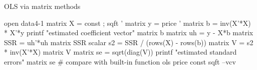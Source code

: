 \begin{script}[htbp]
  \caption{OLS via matrix methods}
  \label{examp-matrix}
\begin{code}
  open data4-1
  matrix X = { const ; sqft }'
  matrix y = { price }'
  matrix b = inv(X'*X) * X'*y
  printf "estimated coefficient vector\n"
  matrix b
  matrix uh = y - X*b
  matrix SSR = uh'*uh
  matrix SSR
  scalar s2 = SSR / (rows(X) - rows(b))
  matrix V = s2 * inv(X'*X)
  matrix V
  matrix se = sqrt(diag(V))
  printf "estimated standard errors\n"
  matrix se
  # compare with built-in function
  ols price const sqft --vcv
\end{code}
\end{script}



















